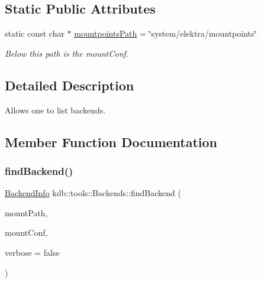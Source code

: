 \subsection*{Static Public Attributes}
\begin{DoxyCompactItemize}
\item 
\mbox{\label{classkdb_1_1tools_1_1Backends_ac867850accaab4fda286f763cacc3926}} 
static const char $\ast$ \mbox{\hyperlink{classkdb_1_1tools_1_1Backends_ac867850accaab4fda286f763cacc3926}{mountpoints\+Path}} = \char`\"{}system/elektra/mountpoints\char`\"{}
\begin{DoxyCompactList}\small\item\em Below this path is the mount\+Conf. \end{DoxyCompactList}\end{DoxyCompactItemize}


\subsection{Detailed Description}
Allows one to list backends. 

\subsection{Member Function Documentation}
\mbox{\label{classkdb_1_1tools_1_1Backends_a692f3f6b5f01ed2e497a6e093e1e2e90}} 
\subsubsection{\texorpdfstring{findBackend()}{findBackend()}}
{\footnotesize\ttfamily \mbox{\hyperlink{structkdb_1_1tools_1_1BackendInfo}{Backend\+Info}} kdb\+::tools\+::\+Backends\+::find\+Backend (\begin{DoxyParamCaption}\item[{std\+::string const \&}]{mount\+Path,  }\item[{\mbox{\hyperlink{classkdb_1_1KeySet}{Key\+Set}}}]{mount\+Conf,  }\item[{bool}]{verbose = {\ttfamily false} }\end{DoxyParamCaption})\hspace{0.3cm}{\ttfamily [static]}}



